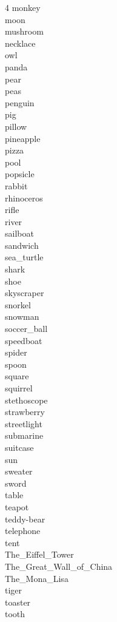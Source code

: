 \documentclass[sigconf]{acmart}
\begin{document}
\begin{multicols}{4}
monkey\\
moon\\
mushroom\\
necklace\\
owl\\
panda\\
pear\\
peas\\
penguin\\
pig\\
pillow\\
pineapple\\
pizza\\
pool\\
popsicle\\
rabbit\\
rhinoceros\\
rifle\\
river\\
sailboat\\
sandwich\\
sea\_turtle\\
shark\\
shoe\\
skyscraper\\
snorkel\\
snowman\\
soccer\_ball\\
speedboat\\
spider\\
spoon\\
square\\
squirrel\\
stethoscope\\
strawberry\\
streetlight\\
submarine\\
suitcase\\
sun\\
sweater\\
sword\\
table\\
teapot\\
teddy-bear\\
telephone\\
tent\\
The\_Eiffel\_Tower\\
The\_Great\_Wall\_of\_China\\
The\_Mona\_Lisa\\
tiger\\
toaster\\
tooth\\

\end{multicols}
\end{document}
